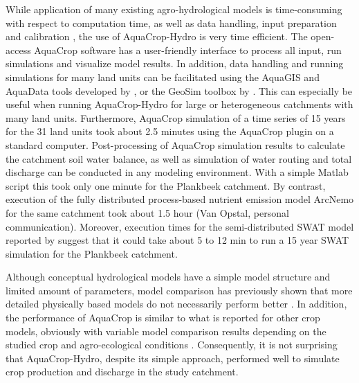 While application of many existing agro-hydrological models is time-consuming with respect to computation time, as well as data handling, input preparation and calibration \parencite{singh2006}, the use of AquaCrop-Hydro is very time efficient. The open-access AquaCrop software has a user-friendly interface to process all input, run simulations and visualize model results. In addition, data handling and running simulations for many land units can be facilitated using the AquaGIS and AquaData tools developed by \textcite{lorite2013}, or the GeoSim toolbox by \textcite{thorp2013}. This can especially be useful when running AquaCrop-Hydro for large or heterogeneous catchments with many land units. Furthermore, AquaCrop simulation of a time series of 15 years for the 31 land units took about 2.5 minutes using the AquaCrop plugin on a standard computer. Post-processing of AquaCrop simulation results to calculate the catchment soil water balance, as well as simulation of water routing and total discharge can be conducted in any modeling environment. With a simple Matlab script \parencite{vangaelen2016d} this took only one minute for the Plankbeek catchment. By contrast, execution of the fully distributed process-based nutrient emission model ArcNemo for the same catchment took about 1.5 hour (Van Opstal, personal communication). Moreover, execution times for the semi-distributed SWAT model reported by \textcite{yalew2013} suggest that it could take about 5 to 12 min to run a 15 year SWAT simulation for the Plankbeek catchment. 
 
Although conceptual hydrological models have a simple model structure and limited amount of parameters, model comparison has previously shown that more detailed physically based models do not necessarily perform better \parencite{breuer2009, refsgaard1996, vansteenkiste2014}. In addition, the performance of AquaCrop is similar to what is reported for other crop models, obviously with variable model comparison results depending on the studied crop and agro-ecological conditions \parencite{abisaab2015, castanedavera2015, paredes2014, todorovic2009}. Consequently, it is not surprising that AquaCrop-Hydro, despite its simple approach, performed well to simulate crop production and discharge in the study catchment. 

